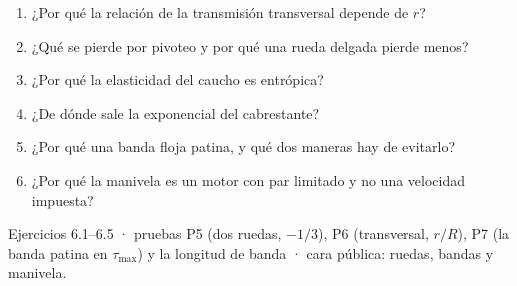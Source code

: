\documentclass[11pt,a4paper]{article}
\begin{document}
\begin{control}
\begin{enumerate}[leftmargin=*]
  \item ¿Por qué la relación de la transmisión transversal depende de $r$?
  \item ¿Qué se pierde por pivoteo y por qué una rueda delgada pierde menos?
  \item ¿Por qué la elasticidad del caucho es entrópica?
  \item ¿De dónde sale la exponencial del cabrestante?
  \item ¿Por qué una banda floja patina, y qué dos maneras hay de evitarlo?
  \item ¿Por qué la manivela es un motor con par limitado y no una velocidad impuesta?
\end{enumerate}
\end{control}

\begin{cierre}
Ejercicios 6.1--6.5 · pruebas P5 (dos ruedas, $-1/3$), P6 (transversal, $r/R$), P7 (la banda patina en
$\tau_{\max}$) y la longitud de banda · cara pública: ruedas, bandas y manivela.
\end{cierre}
\end{document}
